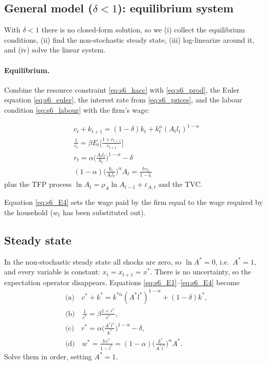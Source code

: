 \subsection{General model ($\delta<1$): equilibrium system }

With $\delta<1$ there is no closed-form solution, so we (i) collect the equilibrium conditions, (ii) find the non-stochastic steady state, (iii) log-linearize around it, and (iv) solve the linear system.

\paragraph{Equilibrium.} Combine the resource constraint \eqref{eq:s6_kacc} with \eqref{eq:s6_prod}, the Euler equation \eqref{eq:s6_euler}, the interest rate from \eqref{eq:s6_prices}, and the labour condition \eqref{eq:s6_labour} with the firm's wage:
\begin{keybox}[title={Equilibrium system (unknowns $c_t,k_{t+1},l_t,r_t$; given $k_t$ and $A_t$)}]
\begin{align}
&c_t+k_{t+1}=(1-\delta)k_t+k_t^{\alpha}(A_tl_t)^{1-\alpha} \label{eq:s6_E1}\\
&\frac1{c_t}=\beta E_t\Big[\frac{1+r_{t+1}}{c_{t+1}}\Big]\label{eq:s6_E2}\\
&r_t=\alpha\Big(\frac{A_tl_t}{k_t}\Big)^{1-\alpha}-\delta\label{eq:s6_E3}\\
&(1-\alpha)\Big(\frac{k_t}{A_tl_t}\Big)^{\alpha}A_t=\frac{b\,c_t}{1-l_t}\label{eq:s6_E4}
\end{align}
plus the TFP process $\ln A_t=\rho_A\ln A_{t-1}+\varepsilon_{A,t}$ and the TVC.
\end{keybox}
Equation \eqref{eq:s6_E4} sets the wage paid by the firm equal to the wage required by the household ($w_t$ has been substituted out).

\subsection{Steady state }

In the non-stochastic steady state all shocks are zero, so $\ln A^*=0$, i.e.\ $A^*=1$, and every variable is constant: $x_t=x_{t+1}=x^*$. There is no uncertainty, so the expectation operator disappears. Equations \eqref{eq:s6_E1}--\eqref{eq:s6_E4} become
\begin{align*}
&\text{(a)}\quad c^*+k^*=k^{*\alpha}(A^*l^*)^{1-\alpha}+(1-\delta)k^*,\\
&\text{(b)}\quad \frac1{c^*}=\beta\frac{1+r^*}{c^*},\\
&\text{(c)}\quad r^*=\alpha\Big(\frac{A^*l^*}{k^*}\Big)^{1-\alpha}-\delta,\\
&\text{(d)}\quad w^*=\frac{b\,c^*}{1-l^*}=(1-\alpha)\Big(\frac{k^*}{A^*l^*}\Big)^{\alpha}A^*.
\end{align*}
Solve them in order, setting $A^*=1$.

